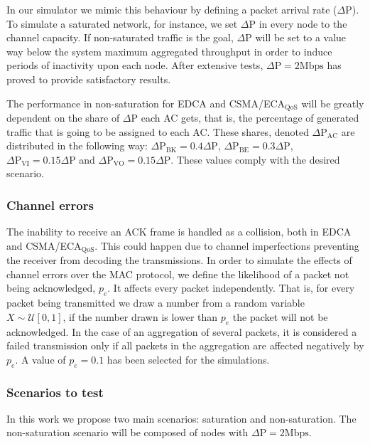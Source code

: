 In our simulator we mimic this behaviour by defining a packet arrival rate ($\Delta\text{P}$). To simulate a saturated network, for instance, we set $\Delta\text{P}$ in every node to the channel capacity. If non-saturated traffic is the goal, $\Delta\text{P}$ will be set to a value way below the system maximum aggregated throughput in order to induce periods of inactivity upon each node. After extensive tests, $\Delta\text{P}=2\text{Mbps}$ has proved to provide satisfactory results.

The performance in non-saturation for EDCA and CSMA/ECA$_{\text{QoS}}$ will be greatly dependent on the share of $\Delta\text{P}$ each AC gets, that is, the percentage of generated traffic that is going to be assigned to each AC. These shares, denoted $\Delta\text{P}_{\text{AC}}$ are distributed in the following way: $\Delta\text{P}_{\text{BK}}=0.4\Delta\text{P}$, $\Delta\text{P}_{\text{BE}}=0.3\Delta\text{P}$, $\Delta\text{P}_{\text{VI}}=0.15\Delta\text{P}$ and $\Delta\text{P}_{\text{VO}}=0.15\Delta\text{P}$. These values comply with the desired scenario.

	
\subsubsection{Channel errors}
The inability to receive an ACK frame is handled as a collision, both in EDCA and CSMA/ECA$_{\text{QoS}}$. This could happen due to channel imperfections preventing the receiver from decoding the transmissions. In order to simulate the effects of channel errors over the MAC protocol, we define the likelihood of a packet not being acknowledged, $p_e$. It affects every packet independently. That is, for every packet being transmitted we draw a number from a random variable $X\sim\mathcal{U}[0,1]$, if the number drawn is lower than $p_e$ the packet will not be acknowledged. In the case of an aggregation of several packets, it is considered a failed transmission only if all packets in the aggregation are affected negatively by $p_e$. A value of $p_e=0.1$ has been selected for the simulations.

\subsubsection{Scenarios to test}
In this work we propose two main scenarios: saturation and non-saturation. The non-saturation scenario will be composed of nodes with $\Delta\text{P}=2\text{Mbps}$.



